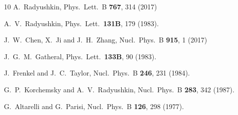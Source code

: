 \documentclass[final,5p,times,twocolumn]{elsarticle}
\begin{document}
\begin{thebibliography}{10}
  A.~Radyushkin,
  Phys.\ Lett.\ B {\bf 767}, 314 (2017)





  A.~V.~Radyushkin,
  Phys.\ Lett.\  {\bf 131B}, 179 (1983).


  J.~W.~Chen, X.~Ji and J.~H.~Zhang,
  Nucl.\ Phys.\ B {\bf 915}, 1 (2017)


  J.~G.~M.~Gatheral,
  Phys.\ Lett.\  {\bf 133B}, 90 (1983).


  J.~Frenkel and J.~C.~Taylor,
  Nucl.\ Phys.\ B {\bf 246}, 231 (1984).


  G.~P.~Korchemsky and A.~V.~Radyushkin,
  Nucl.\ Phys.\ B {\bf 283}, 342 (1987).


  G.~Altarelli and G.~Parisi,
  Nucl.\ Phys.\ B {\bf 126}, 298 (1977).



\end{thebibliography}
\end{document}
